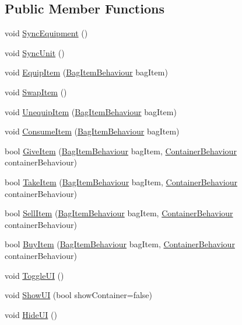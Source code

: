 \subsection*{Public Member Functions}
\begin{DoxyCompactItemize}
\item 
void \mbox{\hyperlink{class_bag_behaviour_ab7a8add6e04a204513a05f0d312df676}{Sync\+Equipment}} ()
\item 
void \mbox{\hyperlink{class_bag_behaviour_a1ab1c5f24022bf503ad3d3a18387515f}{Sync\+Unit}} ()
\item 
void \mbox{\hyperlink{class_bag_behaviour_a472cbdd4764a3f7980c19d83b3789651}{Equip\+Item}} (\mbox{\hyperlink{class_bag_item_behaviour}{Bag\+Item\+Behaviour}} bag\+Item)
\item 
void \mbox{\hyperlink{class_bag_behaviour_addf36803ab1e8f36c33054666a9b7618}{Swap\+Item}} ()
\item 
void \mbox{\hyperlink{class_bag_behaviour_a61062b91187139c43e2681c220111433}{Unequip\+Item}} (\mbox{\hyperlink{class_bag_item_behaviour}{Bag\+Item\+Behaviour}} bag\+Item)
\item 
void \mbox{\hyperlink{class_bag_behaviour_a407231bcd34e96129c9ae624a484a045}{Consume\+Item}} (\mbox{\hyperlink{class_bag_item_behaviour}{Bag\+Item\+Behaviour}} bag\+Item)
\item 
bool \mbox{\hyperlink{class_bag_behaviour_ac72b22f2f0340663e461c4a10f33281d}{Give\+Item}} (\mbox{\hyperlink{class_bag_item_behaviour}{Bag\+Item\+Behaviour}} bag\+Item, \mbox{\hyperlink{class_container_behaviour}{Container\+Behaviour}} container\+Behaviour)
\item 
bool \mbox{\hyperlink{class_bag_behaviour_a0cde4989737c537ca94730cc690d6780}{Take\+Item}} (\mbox{\hyperlink{class_bag_item_behaviour}{Bag\+Item\+Behaviour}} bag\+Item, \mbox{\hyperlink{class_container_behaviour}{Container\+Behaviour}} container\+Behaviour)
\item 
bool \mbox{\hyperlink{class_bag_behaviour_aa0aed3d648b13c1add4c2e2ce2ac9c38}{Sell\+Item}} (\mbox{\hyperlink{class_bag_item_behaviour}{Bag\+Item\+Behaviour}} bag\+Item, \mbox{\hyperlink{class_container_behaviour}{Container\+Behaviour}} container\+Behaviour)
\item 
bool \mbox{\hyperlink{class_bag_behaviour_a22439e4f35b9173c64d16c2534c4b388}{Buy\+Item}} (\mbox{\hyperlink{class_bag_item_behaviour}{Bag\+Item\+Behaviour}} bag\+Item, \mbox{\hyperlink{class_container_behaviour}{Container\+Behaviour}} container\+Behaviour)
\item 
void \mbox{\hyperlink{class_bag_behaviour_a830725c05ecdc1a1a637d26cf5cff0dc}{Toggle\+UI}} ()
\item 
void \mbox{\hyperlink{class_bag_behaviour_aed83310e460fbfb0fa033cfd9fa41ba5}{Show\+UI}} (bool show\+Container=false)
\item 
void \mbox{\hyperlink{class_bag_behaviour_a731b060bd01b971246839664dfd86530}{Hide\+UI}} ()
\end{DoxyCompactItemize}
